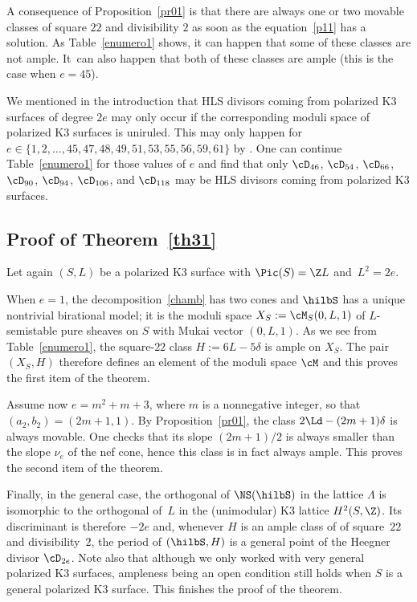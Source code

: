 \begin{rema}
A consequence of Proposition~\ref{pr01} is that there are always one or two movable classes of square $22$ and divisibility $2$ as soon as the equation~\eqref{p11} has a solution. As Table~\ref{enumero1} shows, it can happen that some of these classes are not ample.
It~can also happen that both of these classes are ample (this is the case when $e=45$).
\end{rema}

\begin{rema}\label{other}
We mentioned in the introduction that HLS divisors coming from polarized K3 surfaces of degree $2e$ may only occur if the corresponding moduli space of polarized K3 surfaces is uniruled. This may only happen for $e\in\{1,2,\dots,45,47,48,49,51,53,55,56,59,61\} $ by \cite{ghs}. One can continue Table~\ref{enumero1} for those values of $e$ and find that only $\cD_{46}$, $
\cD_{54}$, $\cD_{66}$, $\cD_{90}$, $\cD_{94}$, $\cD_{106}$, and $\cD_{118}$ may be HLS divisors coming from polarized K3 surfaces.
\end{rema}

\subsection{Proof of Theorem~\ref{th31}}

Let again $(S,L)$ be a polarized K3 surface with $\Pic(S)=\Z L$ and~$L^2=2e$.

When $e=1$, the decomposition~\eqref{chamb} has two cones and $ \hilbS$ has a unique nontrivial \hk birational model; it is the
moduli space $X_S:=\cM_S(0,L,1)$ of $L$-semistable pure sheaves on $S$ with Mukai vector $(0,L,1)$. As we see from Table~\ref{enumero1}, the square-$22$ class $H:=6L-5\delta$ is ample on $X_S$. The pair $(X_S,H)$ therefore defines an element of the moduli space $\cM$ and this proves the first item of the theorem.

Assume now $e=m^2+m+3$, where
$m$ is a nonnegative integer, so that $(a_2,b_2)=(2m+1,1)$. By Proposition~\ref{pr01}, the class $2\Ld-(2m+1)\delta$ is always movable. One checks that its slope $(2m+1)/2$ is always smaller than the slope $\nu_e$ of the nef cone, hence this class is in fact always ample. This proves the second item of the theorem.

Finally, in
the general case, the orthogonal of $\NS(\hilbS) $ in the lattice $\Lambda$ is isomorphic to the orthogonal of~$L$ in the (unimodular) K3 lattice $H^2(S,\Z)$. Its discriminant is therefore $-2e$ and, whenever $H$ is an ample class of of square~$22$ and divisibility~$2$, the period of $(\hilbS,H)$ is a general point of the Heegner divisor $\cD_{2e}$. Note also that although we only worked with very general polarized K3 surfaces, ampleness being an open condition still holds when $S$ is a general polarized K3 surface. This finishes the proof of the theorem.

